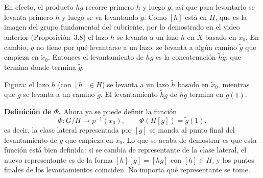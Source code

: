 \documentclass[11pt]{article}
\begin{document}
En efecto, el producto $hg$ recorre primero $h$ y luego $g$, así que para levantarlo se levanta primero $h$ y luego se va levantando $g$. Como $[h]$ está en $H$, que es la imagen del grupo fundamental del cubriente, por lo demostrado en el video anterior (Proposición~3.8) el lazo $h$ se levanta a un lazo $\tilde h$ en $\tilde X$ basado en $\tilde x_0$. En cambio, $g$ no tiene por qué levantarse a un lazo: se levanta a algún camino $\tilde g$ que empieza en $\tilde x_0$. Entonces el levantamiento de $hg$ es la concatenación $\tilde h\tilde g$, que termina donde termina $\tilde g$.

\begin{center}
\end{center}

\noindent Figura: el lazo $h$ (con $[h]\in H$) se levanta a un lazo $\tilde h$ basado en $\tilde x_0$, mientras que $g$ se levanta a un camino $\tilde g$. El levantamiento $\tilde h\tilde g$ de $hg$ termina en $\tilde g(1)$.

\medskip\noindent\textbf{Definición de $\Phi$.} Ahora ya se puede definir la función
\[
  \Phi\colon G/H\to p^{-1}(x_0),\qquad \Phi(H[g])=\tilde g(1),
\]
es decir, la clase lateral representada por $[g]$ se manda al punto final del levantamiento de $g$ que empieza en $\tilde x_0$. Lo que se acaba de demostrar es que esta función está bien definida: si se cambia de representante de la clase lateral, el nuevo representante es de la forma $[h][g]=[hg]$ con $[h]\in H$, y los puntos finales de los levantamientos coinciden. No importa qué representante se tome.
\end{document}
